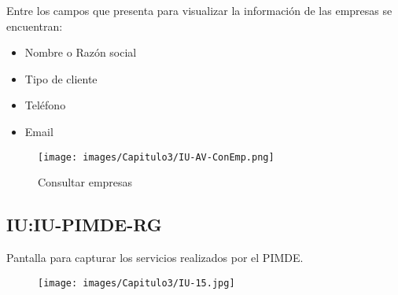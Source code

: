     Entre los campos que presenta para visualizar la información de las empresas se encuentran:
    \begin{itemize}
        \item Nombre o Razón social
        \item Tipo de cliente
        \item Teléfono
        \item Email
    \end{itemize}
\begin{figure}[htbp!]
    \centering
    \texttt{[image: images/Capitulo3/IU-AV-ConEmp.png]}
    \caption{Consultar empresas}
    \label{fig:my_label}
\end{figure}
\clearpage
\hypertarget{IU:IU-PIMDE-RG}{}
\subsection {IU:IU-PIMDE-RG}
Pantalla para capturar los servicios realizados por el PIMDE.
\begin{figure}[htbp!]
    \centering
    \texttt{[image: images/Capitulo3/IU-15.jpg]}
    \label{fig:my_label}
\end{figure}
\clearpage












